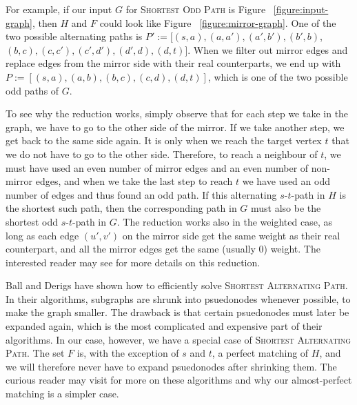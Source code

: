 For example, if our input $G$ for \textsc{Shortest Odd Path} is Figure ~\ref{figure:input-graph}, then $H$ and $F$ could look like Figure ~\ref{figure:mirror-graph}. One of the two possible alternating paths is $P' := [(s,a), (a, a'), (a',b'), (b',b)$, $(b,c), (c,c'), (c',d'), (d',d), (d,t)]$. When we filter out mirror edges and replace edges from the mirror side with their real counterparts, we end up with $P := [(s,a),(a,b),(b,c),(c,d),(d,t)]$, which is one of the two possible odd paths of $G$. 

To see why the reduction works, simply observe that for each step we take in the graph, we have to go to the other side of the mirror. If we take another step, we get back to the same side again. It is only when we reach the target vertex $t$ that we do not have to go to the other side. Therefore, to reach a neighbour of $t$, we must have used an even number of mirror edges and an even number of non-mirror edges, and when we take the last step to reach $t$ we have used an odd number of edges and thus found an odd path. If this alternating $s$-$t$-path in $H$ is the shortest such path, then the corresponding path in $G$ must also be the shortest odd $s$-$t$-path in $G$. The reduction works also in the weighted case, as long as each edge $(u',v')$ on the mirror side get the same weight as their real counterpart, and all the mirror edges get the same (usually 0) weight. The interested reader may see \cite{source:derigs_shortest_odd_path} for more details on this reduction.

Ball and Derigs \cite{source:shortest_alternating_path} have shown how to efficiently solve \textsc{Shortest Alternating Path}. In their algorithms, subgraphs are shrunk into psuedonodes whenever possible, to make the graph smaller. The drawback is that certain psuedonodes must later be expanded again, which is the most complicated and expensive part of their algorithms. In our case, however, we have a special case of \textsc{Shortest Alternating Path}. The set $F$ is, with the exception of $s$ and $t$, a perfect matching of $H$, and we will therefore never have to expand psuedonodes after shrinking them. The curious reader may visit \cite{source:shortest_alternating_path} for more on these algorithms and why our almost-perfect matching is a simpler case.

